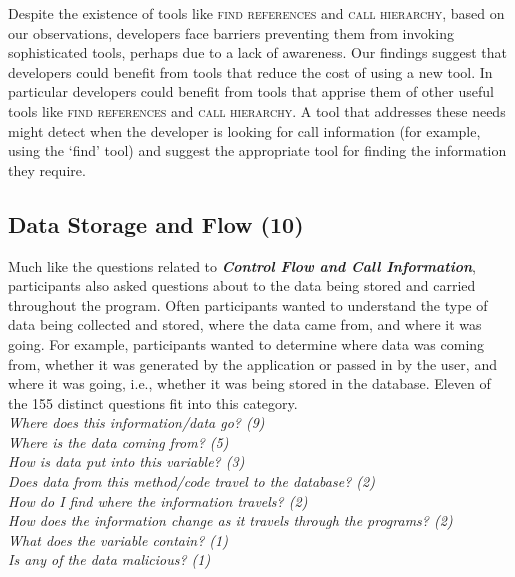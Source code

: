 \documentclass[conference]{IEEEtran}
\begin{document}
Despite the existence of tools like \textsc{find references} and \textsc{call hierarchy}, based on our observations, developers face barriers preventing them from invoking sophisticated tools, perhaps due to a lack of awareness.
Our findings suggest that developers could benefit from tools that reduce the cost of using a new tool.
In particular developers could benefit from tools that apprise them of other useful tools like \textsc{find references} and \textsc{call hierarchy}.
A tool that addresses these needs might detect when the developer is looking for call information (for example, using the `find' tool) and suggest the appropriate tool for finding the information they require. 




\noindent\subsection{\textbf{Data Storage and Flow (10)}}\label{dsf}
Much like the questions related to \emph{\textbf{Control Flow and Call Information}}, participants also asked questions about to the data being stored and carried throughout the program. 
Often participants wanted to understand the type of data being collected and stored, where the data came from, and where it was going. 
For example, participants wanted to determine where data was coming from, whether it was generated by the application or passed in by the user, and where it was going, i.e., whether it was being stored in the database.
Eleven of the 155 distinct questions fit into this category.
\\

\noindent\emph{Where does this information/data go? (9)} \\
\emph{Where is the data coming from? (5)} \\
\emph{How is data put into this variable? (3)} \\
\emph{Does data from this method/code travel to the database? (2)} \\
\emph{How do I find where the information travels? (2)} \\
\emph{How does the information change as it travels through the programs? (2)} \\
\emph{What does the variable contain? (1)} \\
\emph{Is any of the data malicious? (1)} \\
\end{document}
